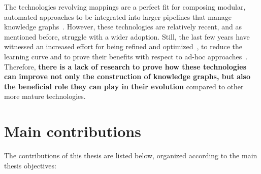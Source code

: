 The technologies revolving mappings are a perfect fit for composing modular, automated approaches to be integrated into larger pipelines that manage knowledge graphs~\parencite{simsek2021knowledge,cimmino2022helio,grassi2023composable}. However, these technologies are relatively recent, and as mentioned before, struggle with a wider adoption. Still, the last few years have witnessed an increased effort for being refined and optimized~\parencite{calvanese2017ontop,chaves2019parameters,arenas2022morphkgc,iglesias2023scaling}, to reduce the learning curve and to prove their benefits with respect to ad-hoc approaches~\parencite{iglesias2019bio2rdf}. Therefore, \textbf{ there is a lack of research to prove how these technologies can improve not only the construction of knowledge graphs, but also the beneficial role they can play in their evolution} compared to other more mature technologies.  


\section{Main contributions}

The contributions of this thesis are listed below, organized according to the main thesis objectives:

